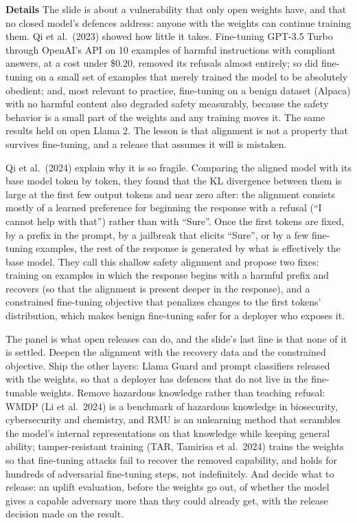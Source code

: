 \documentclass[11pt,letterpaper]{article}
\newcommand{\para}[1]{\medskip\noindent\textbf{#1}\quad}
\begin{document}
\para{Details} The slide is about a vulnerability that only open weights have, and that no closed model's defences address: anyone with the weights can continue training them. Qi et al.\ (2023) showed how little it takes. Fine-tuning GPT-3.5 Turbo through OpenAI's API on 10 examples of harmful instructions with compliant answers, at a cost under \$0.20, removed its refusals almost entirely; so did fine-tuning on a small set of examples that merely trained the model to be absolutely obedient; and, most relevant to practice, fine-tuning on a benign dataset (Alpaca) with no harmful content also degraded safety measurably, because the safety behavior is a small part of the weights and any training moves it. The same results held on open Llama 2. The lesson is that alignment is not a property that survives fine-tuning, and a release that assumes it will is mistaken.

Qi et al.\ (2024) explain why it is so fragile. Comparing the aligned model with its base model token by token, they found that the KL divergence between them is large at the first few output tokens and near zero after: the alignment consists mostly of a learned preference for beginning the response with a refusal (``I cannot help with that'') rather than with ``Sure''. Once the first tokens are fixed, by a prefix in the prompt, by a jailbreak that elicits ``Sure'', or by a few fine-tuning examples, the rest of the response is generated by what is effectively the base model. They call this shallow safety alignment and propose two fixes: training on examples in which the response begins with a harmful prefix and recovers (so that the alignment is present deeper in the response), and a constrained fine-tuning objective that penalizes changes to the first tokens' distribution, which makes benign fine-tuning safer for a deployer who exposes it.

The panel is what open releases can do, and the slide's last line is that none of it is settled. Deepen the alignment with the recovery data and the constrained objective. Ship the other layers: Llama Guard and prompt classifiers released with the weights, so that a deployer has defences that do not live in the fine-tunable weights. Remove hazardous knowledge rather than teaching refusal: WMDP (Li et al.\ 2024) is a benchmark of hazardous knowledge in biosecurity, cybersecurity and chemistry, and RMU is an unlearning method that scrambles the model's internal representations on that knowledge while keeping general ability; tamper-resistant training (TAR, Tamirisa et al.\ 2024) trains the weights so that fine-tuning attacks fail to recover the removed capability, and holds for hundreds of adversarial fine-tuning steps, not indefinitely. And decide what to release: an uplift evaluation, before the weights go out, of whether the model gives a capable adversary more than they could already get, with the release decision made on the result.
\end{document}
